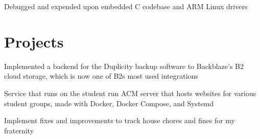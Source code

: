 \documentclass[letterpaper]{deedy-resume} %
\begin{document}
\begin{minipage}[t]{0.66\textwidth}



\begin{tightitemize}
\item Debugged and expended upon embedded C codebase and ARM Linux drivers
\end{tightitemize}

\sectionspace %


\section{Projects}


\begin{tightitemize}
\item Implemented a backend for the Duplicity backup software to Backblaze's B2
  cloud storage, which is now one of B2s most used integrations
\end{tightitemize}

\sectionspace %



\begin{tightitemize}
\item Service that runs on the student run ACM server that hosts websites for
  various student groups, made with Docker, Docker Compose, and Systemd
\end{tightitemize}

\sectionspace %



\begin{tightitemize}
\item Implement fixes and improvements to track house chores and fines
  for my fraternity
\end{tightitemize}


\end{minipage}
\end{document}

